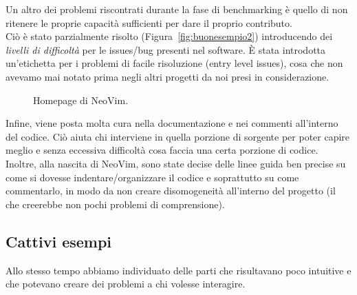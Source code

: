 \documentclass[12pt]{article} %
\begin{document}
Un altro dei problemi riscontrati durante la fase di benchmarking \`e quello di non ritenere le proprie capacit\`a sufficienti per dare il proprio contributo.\\
Ci\`o \`e stato parzialmente risolto (Figura~\ref{fig:buonesempio2}) introducendo dei \emph{livelli di difficolt\`a} per le issues/bug presenti nel software. \`E stata introdotta un'etichetta per i problemi di facile risoluzione (entry level issues), cosa che non avevamo mai notato prima negli altri progetti da noi presi in considerazione.

\begin{figure}[H]
\caption{Homepage di NeoVim.}
\label{fig:buonesempio3}
\end{figure}

Infine, viene posta molta cura nella documentazione e nei commenti all'interno del codice. Ci\`o aiuta chi interviene in quella porzione di sorgente per poter capire meglio e senza eccessiva difficolt\`a cosa faccia una certa porzione di codice.\\
Inoltre, alla nascita di NeoVim, sono state decise delle linee guida ben precise su come si dovesse indentare/organizzare il codice e soprattutto su come commentarlo, in modo da non creare disomogeneit\`a all'interno del progetto (il che creerebbe non pochi problemi di comprensione).\\

\subsection{Cattivi esempi}
\label{badexamples}
Allo stesso tempo abbiamo individuato delle parti che risultavano poco intuitive e che potevano creare dei problemi a chi volesse interagire.
\end{document}
